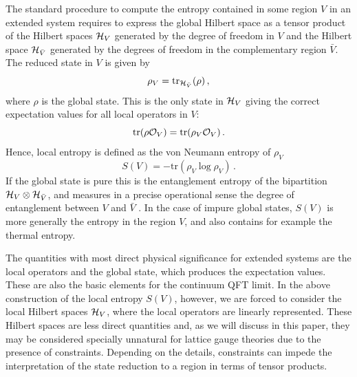 \documentclass[12pt,a4paper]{article}
\begin{document}
The standard procedure to compute the entropy contained in some region $V$ in an extended system  
requires to express the global Hilbert space as a tensor product of the Hilbert spaces ${\cal H}_V$ generated by the 
degree of freedom in $V$ and the Hilbert space ${\cal H}_{\bar{V}}$ generated by the degrees of freedom in the complementary region $\bar{V}$. 
The reduced state in $V$ is given by 
 \begin{equation}
 \rho_V=\textrm{tr}_{{\cal H}_{\bar{V}}}(\rho)\,,\label{fomi}
 \end{equation}
 where $\rho$ is the global state. 
  This is the only state in ${\cal H}_V$ giving the correct expectation values for all local operators in $V$:
 \begin{equation}
 \textrm{tr}(\rho {\cal O}_V)=\textrm{tr}(\rho_V {\cal O}_V)\,.
 \end{equation}    
Hence, local entropy is defined as the von Neumann entropy of $\rho_V$
\begin{equation}
S(V)=-\textrm{tr}(\rho_V \log \rho_V)\,. \label{fomi1}
\end{equation}
If the global state is pure this is the entanglement entropy of the bipartition ${\cal H}_V\otimes {\cal H}_{\bar{V}}$, and measures 
in a precise operational sense the degree of entanglement between $V$ and $\bar{V}$ \cite{nielsen}. In the case of impure global states, $S(V)$ 
is more generally the entropy in the region $V$, and also contains for example the thermal entropy.   

The quantities with most direct physical significance for extended systems are the local operators and 
the global state, which produces the expectation values. 
These are also the basic elements for the continuum QFT limit. 
In the above construction of the local entropy $S(V)$, however, we are forced to consider the local Hilbert spaces ${\cal H}_V$, where the 
local operators are linearly represented. These Hilbert spaces are less direct quantities and, as we will discuss in this paper, they may be considered specially unnatural 
for lattice gauge theories due to the presence of constraints. Depending on the details, constraints can impede the interpretation of the state reduction to a region in terms of tensor products. 
\end{document}
